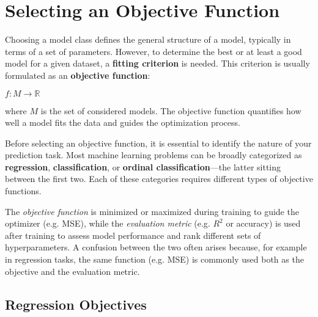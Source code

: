 \documentclass[12pt,openany]{book}
\begin{document}
\section{Selecting an Objective Function}

Choosing a model class defines the general structure of a model, 
typically in terms of a set of parameters. However, to determine 
the best or at least a good model for a given dataset, a 
\textbf{fitting criterion} is needed. This criterion is usually 
formulated as an \textbf{objective function}:

\ensuremath{f : M \to \mathbb{R}}

where \( M \) is the set of considered models. The objective function 
quantifies how well a model fits the data and guides the optimization 
process.

Before selecting an objective function, it is essential to identify 
the nature of your prediction task. Most machine learning problems 
can be broadly categorized as \textbf{regression}, 
\textbf{classification}, or \textbf{ordinal classification}—the latter 
sitting between the first two. Each of these categories requires 
different types of objective functions.

\begin{notebox}
The \textit{objective function} is minimized or maximized during training 
to guide the optimizer (e.g. MSE), while the \textit{evaluation metric} 
(e.g. $R^2$ or accuracy) is used after training to assess model performance 
and rank different sets of hyperparameters. A confusion between the two 
often arises because, for example in regression tasks, the same function (e.g. MSE) is 
commonly used both as the objective and the evaluation metric.
\end{notebox}


\subsection{Regression Objectives}
\end{document}
